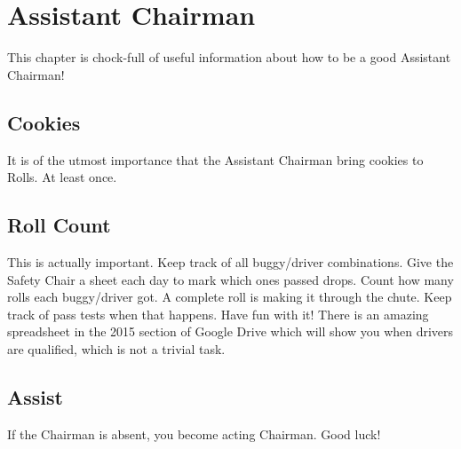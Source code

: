 \chapter{Assistant Chairman}
This chapter is chock-full of useful information about how to be a good
Assistant Chairman!

\section{Cookies}
It is of the utmost importance that the Assistant Chairman bring cookies
to Rolls. At least once.

\section{Roll Count}
This is actually important. Keep track of all buggy/driver combinations.
Give the Safety Chair a sheet each day to mark which ones passed drops.
Count how many rolls each buggy/driver got. A complete roll is making
it through the chute. Keep track of pass tests when that happens.
Have fun with it! There is an amazing spreadsheet in the 2015 section of
Google Drive which will show you when drivers are qualified, which is not
a trivial task.

\section{Assist}
If the Chairman is absent, you become acting Chairman. Good luck!
